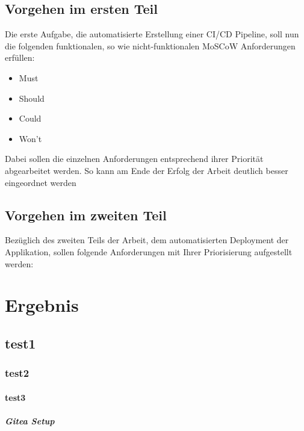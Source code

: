 \documentclass[12pt, a4paper]{scrbook}
\begin{document}
\section{Vorgehen im ersten Teil}
Die erste Aufgabe, die automatisierte Erstellung einer CI/CD Pipeline, soll nun die folgenden funktionalen, so wie nicht-funktionalen MoSCoW Anforderungen erfüllen:
\begin{itemize}
\item Must
\begin{itemize}

\end{itemize}
\item Should
\begin{itemize}

\end{itemize}
\item Could
\begin{itemize}

\end{itemize}
\item Won't
\begin{itemize}
\end{itemize}
\end{itemize}
Dabei sollen die einzelnen Anforderungen entsprechend ihrer Priorität abgearbeitet werden. So kann am Ende der Erfolg der Arbeit deutlich besser eingeordnet werden
\section{Vorgehen im zweiten Teil}
Bezüglich des zweiten Teils der Arbeit, dem automatisierten Deployment der Applikation, sollen folgende Anforderungen mit Ihrer Priorisierung aufgestellt werden:

\let\cleardoublepage\relax
\chapter{Ergebnis}
\section{test1}
\subsection{test2}
\subsubsection{test3}
\paragraph*{Gitea Setup}
\end{document}
